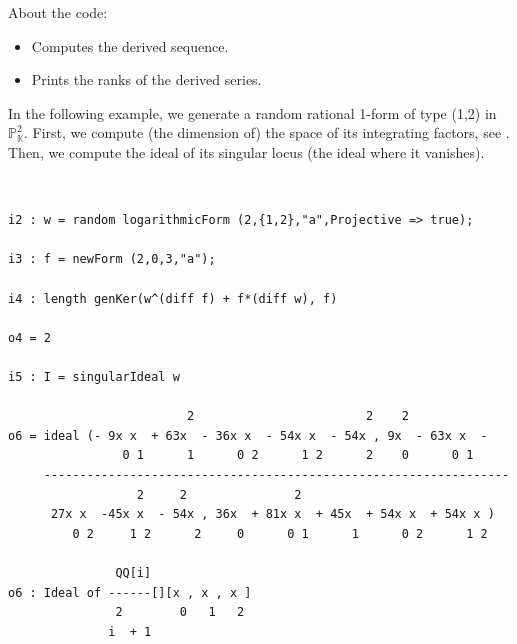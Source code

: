 \documentclass{amsart}
\theoremstyle{definition}
\def\KK{\mathbb{K}}
\def\PP{\mathbb{P}}
\begin{document}
\noindent About the code:
\begin{itemize}
\item[\tt i5.]
Computes the derived sequence.
\item[\tt i6.]
Prints the ranks of the derived series.
\end{itemize}

\bigskip

\ex\label{ex4} In the following example, we generate a random rational 1-form of type (1,2) in $\PP^2_\KK$. First, we compute (the dimension of) the space of its integrating factors, see \cite[pp.~828-829]{suwa-review}. Then, we compute the ideal of its singular 
locus (the ideal where it vanishes).

\bigskip

{\tt\footnotesize
\begin{lstlisting}
i2 : w = random logarithmicForm (2,{1,2},"a",Projective => true);

i3 : f = newForm (2,0,3,"a");

i4 : length genKer(w^(diff f) + f*(diff w), f)

o4 = 2

i5 : I = singularIdeal w

                         2                        2    2
o6 = ideal (- 9x x  + 63x  - 36x x  - 54x x  - 54x , 9x  - 63x x  -
                0 1      1      0 2      1 2      2    0      0 1
     -----------------------------------------------------------------
                  2     2               2
      27x x  -45x x  - 54x , 36x  + 81x x  + 45x  + 54x x  + 54x x )
         0 2     1 2      2     0      0 1      1      0 2      1 2

               QQ[i]
o6 : Ideal of ------[][x , x , x ]
               2        0   1   2
              i  + 1
\end{lstlisting}
}


{}



\end{document}
